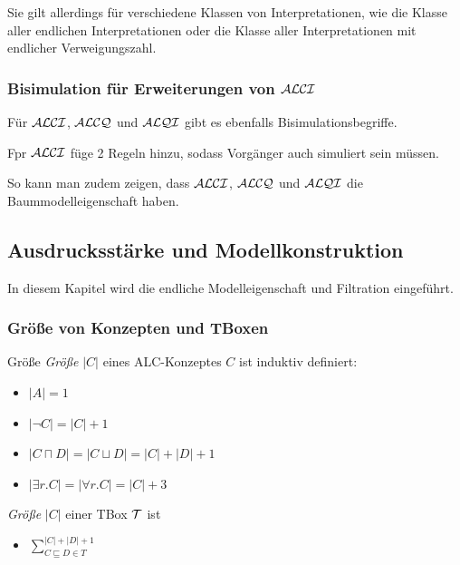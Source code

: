 Sie gilt allerdings für verschiedene Klassen von Interpretationen, wie die Klasse aller endlichen Interpretationen oder die Klasse aller Interpretationen mit endlicher Verweigungszahl.

\subsubsection{Bisimulation für Erweiterungen von \texorpdfstring{$\mathcal{A}\mathcal{L}\mathcal{C}\mathcal{I}$}{ALCI}}\label{bisimulation-in-alci}

Für $\mathcal{A}\mathcal{L}\mathcal{C}\mathcal{I}$, $\mathcal{A}\mathcal{L}\mathcal{C}\mathcal{Q}$ und $\mathcal{A}\mathcal{L}\mathcal{Q}\mathcal{I}$ gibt es ebenfalls Bisimulationsbegriffe.

Fpr $\mathcal{A}\mathcal{L}\mathcal{C}\mathcal{I}$ füge 2 Regeln hinzu, sodass Vorgänger auch simuliert sein müssen.

So kann man zudem zeigen, dass $\mathcal{A}\mathcal{L}\mathcal{C}\mathcal{I}$, $\mathcal{A}\mathcal{L}\mathcal{C}\mathcal{Q}$ und $\mathcal{A}\mathcal{L}\mathcal{Q}\mathcal{I}$ die Baummodelleigenschaft haben.

\subsection{Ausdrucksstärke und
Modellkonstruktion}\label{ausdrucksstuxe4rke-und-modellkonstruktion}

In diesem Kapitel wird die endliche Modelleigenschaft und Filtration eingeführt.

\subsubsection{Größe von Konzepten und
TBoxen}\label{gruxf6uxdfe-von-konzepten-und-tboxen}

\begin{definition}{Größe}
\emph{Größe} $\left| C \right|$ eines ALC-Konzeptes $C$ ist induktiv
definiert:

\begin{itemize}
\item
  $\left| A \right| = 1$
\item
  $\left| \neg C \right| = \left| C \right| + 1$
\item
  $\left| C \sqcap D \right| = \left| C \sqcup D \right| = \left| C \right| + \left| D \right| + 1$
\item
  $\left| \exists r.C \right| = \left| \forall r.C \right| = \left| C \right| + 3$
\end{itemize}

\emph{Größe} $\left| C \right|$ einer TBox $\mathcal{T}$ ist

\begin{itemize}
\item
  $\sum_{C \sqsubseteq D \in T}^{\left| C \right| + \left| D \right| + 1}$
\end{itemize}
\end{definition}

